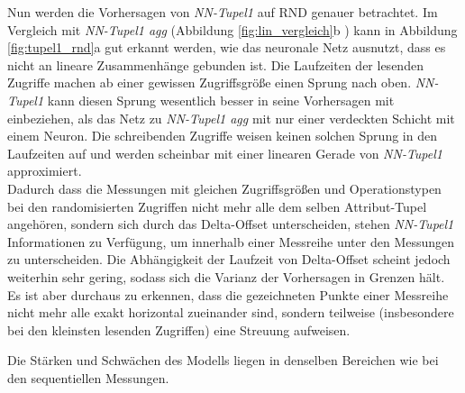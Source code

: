 \documentclass[
	12pt,
	a4paper,
	BCOR10mm,
	DIV14,
	listof=totoc,
	bibliography=totoc,
	headsepline
]{scrreprt}
\begin{document}
Nun werden die Vorhersagen von \textit{NN-Tupel1} auf RND genauer betrachtet.
Im Vergleich mit \textit{NN-Tupel1 agg} (Abbildung \ref{fig:lin_vergleich}b ) kann in Abbildung \ref{fig:tupel1_rnd}a gut erkannt werden, wie das neuronale Netz ausnutzt, dass es nicht an lineare Zusammenhänge gebunden ist.
Die Laufzeiten der lesenden Zugriffe machen ab einer gewissen Zugriffsgröße einen Sprung nach oben. \textit{NN-Tupel1} kann diesen Sprung wesentlich besser in seine Vorhersagen mit einbeziehen, als das Netz zu \textit{NN-Tupel1 agg} mit nur einer verdeckten Schicht mit einem Neuron.
Die schreibenden Zugriffe weisen keinen solchen Sprung in den Laufzeiten auf und werden scheinbar mit einer linearen Gerade von \textit{NN-Tupel1} approximiert.\\
Dadurch dass die Messungen mit gleichen Zugriffsgrößen und Operationstypen bei den randomisierten Zugriffen nicht mehr alle dem selben Attribut-Tupel angehören, sondern sich durch das Delta-Offset unterscheiden, stehen \textit{NN-Tupel1} Informationen zu Verfügung, um innerhalb einer Messreihe unter den Messungen zu unterscheiden.
Die Abhängigkeit der Laufzeit von Delta-Offset scheint jedoch weiterhin sehr gering, sodass sich die Varianz der Vorhersagen in Grenzen hält.
Es ist aber durchaus zu erkennen, dass die gezeichneten Punkte einer Messreihe nicht mehr alle exakt horizontal zueinander sind, sondern teilweise (insbesondere bei den kleinsten lesenden Zugriffen) eine Streuung aufweisen.\medskip

Die Stärken und Schwächen des Modells liegen
in denselben Bereichen wie bei den sequentiellen Messungen.
\end{document}
